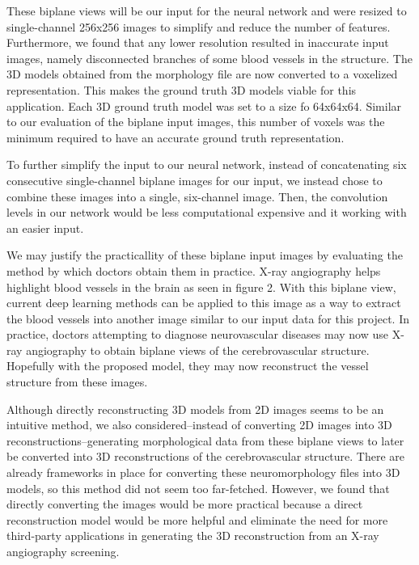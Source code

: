 \documentclass[conference, 10pt]{IEEEtran}
\begin{document}
These biplane views will be our input for the neural network and were resized to single-channel 256x256 images to simplify and reduce the number of features. Furthermore, we found that any lower resolution resulted in inaccurate input images, namely disconnected branches of some blood vessels in the structure. The 3D models obtained from the morphology file are now converted to a voxelized representation. This makes the ground truth 3D models viable for this application. Each 3D ground truth model was set to a size fo 64x64x64. Similar to our evaluation of the biplane input images, this number of voxels was the minimum required to have an accurate ground truth representation.


To further simplify the input to our neural network, instead of concatenating six consecutive single-channel biplane images for our input, we instead chose to combine these images into a single, six-channel image. Then, the convolution levels in our network would be less computational expensive and it working with an easier input.

We may justify the practicallity of these biplane input images by evaluating the method by which doctors obtain them in practice. X-ray angiography helps highlight blood vessels in the brain as seen in figure 2. With this biplane view, current deep learning methods \cite{Angiography Segmentation} can be applied to this image as a way to extract the blood vessels into another image similar to our input data for this project. In practice, doctors attempting to diagnose neurovascular diseases may now use X-ray angiography to obtain biplane views of the cerebrovascular structure. Hopefully with the proposed model, they may now reconstruct the vessel structure from these images.

Although directly reconstructing 3D models from 2D images seems to be an intuitive method, we also considered--instead of converting 2D images into 3D reconstructions--generating morphological data from these biplane views to later be converted into 3D reconstructions of the cerebrovascular structure. There are already frameworks in place for converting these neuromorphology files into 3D models, so this method did not seem too far-fetched. However, we found that directly converting the images would be more practical because a direct reconstruction model would be more helpful and eliminate the need for more third-party applications in generating the 3D reconstruction from an X-ray angiography screening.
\end{document}
